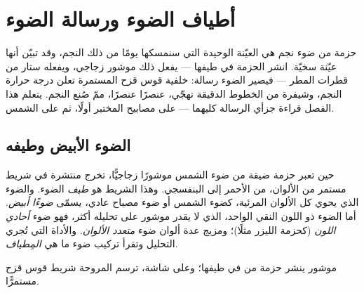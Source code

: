 \chapter{أطياف الضوء ورسالة الضوء}\label{ch:g10:light-spectra}

حزمة من ضوء نجم هي العيّنة الوحيدة التي سنمسكها يومًا من ذلك النجم، وقد
تبيّن أنها عيّنة سخيّة. انشر الحزمة في طيفها --- يفعل ذلك موشور زجاجي،
ويفعله ستار من قطرات المطر --- فيصير الضوء
رسالة: خلفية قوس قزح المستمرة تعلن درجة حرارة النجم،
وشيفرة من الخطوط الدقيقة تهجّي، عنصرًا عنصرًا،
ممّ صُنع النجم. يتعلم هذا الفصل قراءة جزأي
الرسالة كليهما --- على مصابيح المختبر أولًا، ثم على الشمس.

\section{الضوء الأبيض وطيفه}

\begin{definition}\label{def:g10:light-spectra:white}
حين تعبر حزمة ضيقة من ضوء الشمس موشورًا زجاجيًّا، تخرج منتشرة
في شريط مستمر من الألوان، من الأحمر إلى البنفسجي. وهذا الشريط هو
\emph{طيف} الضوء. والضوء الذي يحوي كل
الألوان المرئية، كضوء الشمس أو ضوء مصباح عادي، يسمّى
\emph{ضوءًا أبيض}. أما الضوء ذو اللون النقي الواحد، الذي
لا يقدر موشور على تحليله أكثر، فهو ضوء
\emph{أحادي اللون} (كحزمة الليزر
مثلًا)؛ ومزيج عدة ألوان ضوء
\emph{متعدد الألوان}. والأداة التي
تُجري التحليل وتقرأ تركيب ضوء ما هي
\emph{المِطياف}.
\end{definition}

\begin{omfigure}

{\small موشور ينشر حزمة من  في طيفها؛ وعلى
شاشة، ترسم المروحة شريط قوس قزح مستمرًّا.}
\end{omfigure}


